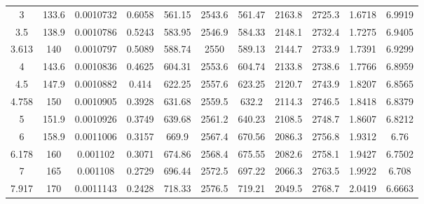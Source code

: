 \begin{longtable}{ccccccccccc}
3        & 133.6       & 0.0010732              & 0.6058              & 561.15                 & 2543.6              & 561.47          & 2163.8       & 2725.3       & 1.6718         & 6.9919      \\
3.5      & 138.9       & 0.0010786              & 0.5243              & 583.95                 & 2546.9              & 584.33          & 2148.1       & 2732.4       & 1.7275         & 6.9405      \\
3.613    & 140         & 0.0010797              & 0.5089              & 588.74                 & 2550                & 589.13          & 2144.7       & 2733.9       & 1.7391         & 6.9299      \\
4        & 143.6       & 0.0010836              & 0.4625              & 604.31                 & 2553.6              & 604.74          & 2133.8       & 2738.6       & 1.7766         & 6.8959      \\
4.5      & 147.9       & 0.0010882              & 0.414               & 622.25                 & 2557.6              & 623.25          & 2120.7       & 2743.9       & 1.8207         & 6.8565      \\
4.758    & 150         & 0.0010905              & 0.3928              & 631.68                 & 2559.5              & 632.2           & 2114.3       & 2746.5       & 1.8418         & 6.8379      \\
5        & 151.9       & 0.0010926              & 0.3749              & 639.68                 & 2561.2              & 640.23          & 2108.5       & 2748.7       & 1.8607         & 6.8212      \\
6        & 158.9       & 0.0011006              & 0.3157              & 669.9                  & 2567.4              & 670.56          & 2086.3       & 2756.8       & 1.9312         & 6.76        \\
6.178    & 160         & 0.001102               & 0.3071              & 674.86                 & 2568.4              & 675.55          & 2082.6       & 2758.1       & 1.9427         & 6.7502      \\
7        & 165         & 0.001108               & 0.2729              & 696.44                 & 2572.5              & 697.22          & 2066.3       & 2763.5       & 1.9922         & 6.708       \\
7.917    & 170         & 0.0011143              & 0.2428              & 718.33                 & 2576.5              & 719.21          & 2049.5       & 2768.7       & 2.0419         & 6.6663      \\

\end{longtable}
